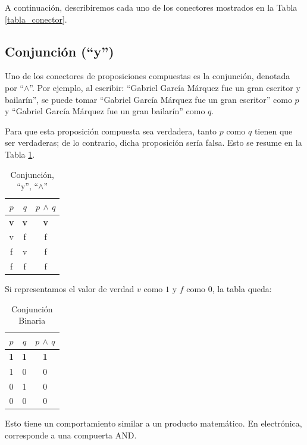 A continuación, describiremos cada uno de los conectores mostrados en la Tabla \ref{tabla_conector}.

\subsection{Conjunción (``y'')}

Uno de los conectores de proposiciones compuestas es la conjunción, denotada por ``$\land$''. Por ejemplo, al escribir: ``Gabriel García Márquez fue un gran escritor y bailarín'', se puede tomar ``Gabriel García Márquez fue un gran escritor'' como $p$ y ``Gabriel García Márquez fue un gran bailarín'' como $q$.

Para que esta proposición compuesta sea verdadera, tanto $p$ como $q$ tienen que ser verdaderas; de lo contrario, dicha proposición sería falsa. Esto se resume en la Tabla \ref{tabla:conjuncion}.

\begin{table}[ht]
\caption{Conjunción, ``y'', ``$\land$''}\label{tabla:conjuncion}
\centering
\begin{tabular}{|c|c|c|}
\hline
$p$ & $q$ & $p$ $\land$ $q$ \\ \hline
\textbf{v}   & \textbf{v}   & \textbf{v}               \\ \hline
v   & f   & f               \\ \hline
f   & v   & f               \\ \hline
f   & f   & f               \\ \hline
\end{tabular}
\end{table}

Si representamos el valor de verdad $v$ como $1$ y $f$ como $0$, la tabla queda:

\begin{table}[ht]
\caption{Conjunción Binaria}\label{tabla:conjuncion_bin}
\centering
\begin{tabular}{|c|c|c|}
\hline
$p$ & $q$ & $p$ $\land$ $q$ \\ \hline
\textbf{1}   & \textbf{1}   & \textbf{1}              \\ \hline
1   & 0   & 0               \\ \hline
0   & 1   & 0               \\ \hline
0   & 0   & 0               \\ \hline
\end{tabular}
\end{table}
Esto tiene un comportamiento similar a un producto matemático. En electrónica, corresponde a una compuerta AND.

